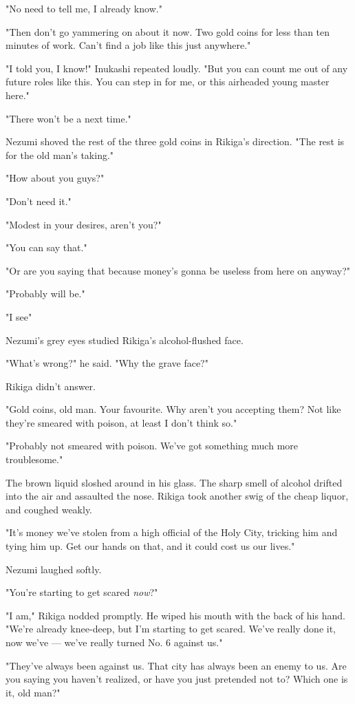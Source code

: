"No need to tell me, I already know."

"Then don't go yammering on about it now. Two gold coins for less than
ten minutes of work. Can't find a job like this just anywhere."

"I told you, I know!" Inukashi repeated loudly. "But you can count me
out of any future roles like this. You can step in for me, or this
airheaded young master here."

"There won't be a next time."

Nezumi shoved the rest of the three gold coins in Rikiga's direction.
"The rest is for the old man's taking."

"How about you guys?"

"Don't need it."

"Modest in your desires, aren't you?"

"You can say that."

"Or are you saying that because money's gonna be useless from here on
anyway?"

"Probably will be."

"I see\el "

Nezumi's grey eyes studied Rikiga's alcohol-flushed face.

"What's wrong?" he said. "Why the grave face?"

Rikiga didn't answer.

"Gold coins, old man. Your favourite. Why aren't you accepting them? Not
like they're smeared with poison, at least I don't think so."

"Probably not smeared with poison. We've got something much more
troublesome."

The brown liquid sloshed around in his glass. The sharp smell of alcohol
drifted into the air and assaulted the nose. Rikiga took another swig of
the cheap liquor, and coughed weakly.

"It's money we've stolen from a high official of the Holy City, tricking
him and tying him up. Get our hands on that, and it could cost us our
lives."

Nezumi laughed softly.

"You're starting to get scared \emph{now}?"

"I am," Rikiga nodded promptly. He wiped his mouth with the back of his
hand. "We're already knee-deep, but I'm starting to get scared. We've
really done it, now we've --- we've really turned No. 6 against us."

"They've always been against us. That city has always been an enemy to
us. Are you saying you haven't realized, or have you just pretended not
to? Which one is it, old man?"

